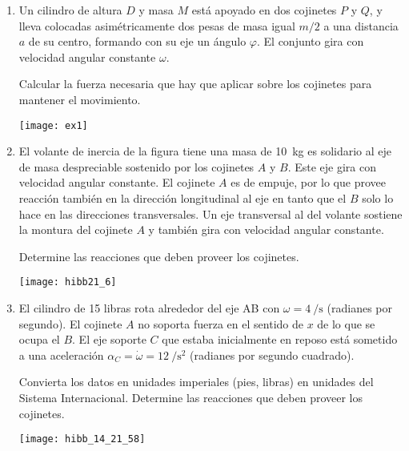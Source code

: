 \documentclass[11pt, spanish, a4paper, twoside]{article}
\begin{document}
\begin{enumerate}
\item 
\begin{minipage}[t][3.5cm]{0.6\textwidth}
Un cilindro de altura \(D\) y masa \(M\) está apoyado en dos cojinetes \(P\) y \(Q\), y lleva colocadas asimétricamente dos pesas de masa igual \(m/2\) a una distancia \(a\) de su centro, formando con su eje un ángulo \(\varphi\).
El conjunto gira con velocidad angular constante \(\omega\).
\begin{tasks} 
	\task Calcular la fuerza necesaria que hay que aplicar sobre los cojinetes para mantener el movimiento.
\end{tasks}
\end{minipage}
\begin{minipage}[c][0.5cm][t]{0.35\textwidth}
	\texttt{[image: ex1]}
\end{minipage}



\item 
\begin{minipage}[t][4.6cm]{0.6\textwidth}
El volante de inercia de la figura tiene una masa de \SI{10}{\kilo\gram} es solidario al eje de masa despreciable sostenido por los cojinetes \(A\) y \(B\).
Este eje gira con velocidad angular constante.
El cojinete \(A\) es de empuje, por lo que provee reacción también en la dirección longitudinal al eje en tanto que el \(B\) solo lo hace en las direcciones transversales.
Un eje transversal al del volante sostiene la montura del cojinete \(A\) y también gira con velocidad angular constante.
\begin{tasks} 
	\task Determine las reacciones que deben proveer los cojinetes.
\end{tasks}
\end{minipage}
\begin{minipage}[c][0.5cm][t]{0.35\textwidth}
	\texttt{[image: hibb21\_6]}
\end{minipage}



\item 
\begin{minipage}[t][3.5cm]{0.65\textwidth}
El cilindro de 15 libras rota alrededor del eje AB con \(\omega = \SI{4}{\per\second}\) (radianes por segundo).
El cojinete \(A\) no soporta fuerza en el sentido de \(x\) de lo que se ocupa el \(B\).
El eje soporte \(C\) que estaba inicialmente en reposo está sometido a una aceleración \(\alpha_C = \dot{\omega} = \SI{12}{\per\second\squared}\) (radianes por segundo cuadrado). 
\begin{tasks}
	\task Convierta los datos en unidades imperiales (pies, libras) en unidades del Sistema Internacional.
	\task Determine las reacciones que deben proveer los cojinetes.
\end{tasks}
\end{minipage}
\begin{minipage}[c][2cm][t]{0.3\textwidth}
	\texttt{[image: hibb\_14\_21\_58]}
\end{minipage}




\end{enumerate}
\end{document}
